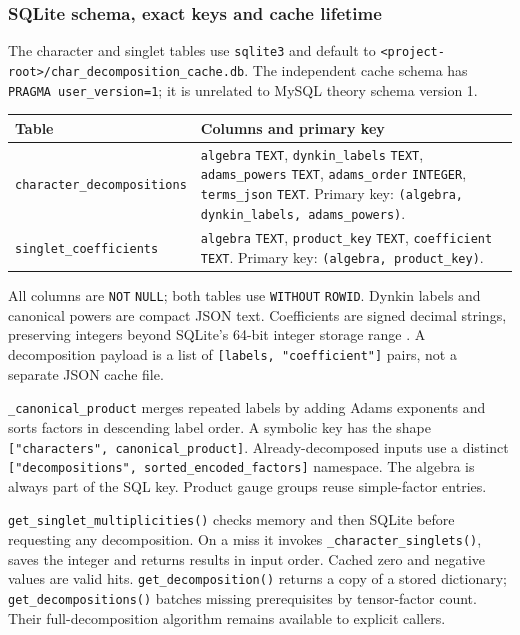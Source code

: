 \documentclass[11pt,a4paper]{article}
\numberwithin{equation}{section}
\newcommand{\code}[1]{{\small\nolinkurl{#1}}}
\begin{document}
\subsubsection{SQLite schema, exact keys and cache lifetime}
The character and singlet tables use \code{sqlite3} and default to
\code{<project-root>/char_decomposition_cache.db}. The independent cache schema
has \code{PRAGMA user_version=1}; it is unrelated to MySQL theory schema version 1.
\begin{tabularx}{\textwidth}{@{}p{49mm}Y@{}}
\toprule Table & Columns and primary key\\\midrule
\code{character_decompositions} & \code{algebra} \code{TEXT},
\code{dynkin_labels} \code{TEXT}, \code{adams_powers} \code{TEXT},
\code{adams_order} \code{INTEGER}, \code{terms_json} \code{TEXT}.\newline
Primary key: \code{(algebra, dynkin_labels, adams_powers)}.\\[4pt]
\code{singlet_coefficients} & \code{algebra} \code{TEXT},
\code{product_key} \code{TEXT}, \code{coefficient} \code{TEXT}.\newline
Primary key: \code{(algebra, product_key)}.\\\bottomrule
\end{tabularx}
All columns are \code{NOT} \code{NULL}; both tables use \code{WITHOUT} \code{ROWID}.
Dynkin labels and canonical powers are compact JSON text. Coefficients are signed
decimal strings, preserving integers beyond SQLite's 64-bit integer storage
range \cite{sqlite-types}. A decomposition payload is a list of
\code{[labels, "coefficient"]} pairs, not a separate JSON cache file.

\code{_canonical_product} merges repeated labels by adding Adams exponents and
sorts factors in descending label order. A symbolic key has the shape
\code{["characters", canonical_product]}. Already-decomposed inputs use a distinct
\code{["decompositions", sorted_encoded_factors]} namespace. The algebra is always
part of the SQL key. Product gauge groups reuse simple-factor entries.

\code{get_singlet_multiplicities()} checks memory and then SQLite before requesting
any decomposition. On a miss it invokes \code{_character_singlets()}, saves the
integer and returns results in input order. Cached zero and negative values are
valid hits. \code{get_decomposition()} returns a copy of a stored dictionary;
\code{get_decompositions()} batches missing prerequisites by tensor-factor count.
Their full-decomposition algorithm remains available to explicit callers.
\end{document}
